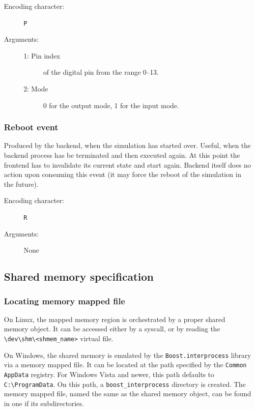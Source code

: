 \begin{description}
    \item[Encoding character:] \texttt{P}
    \item[Arguments:] \hfill
    \begin{description}
        \item[1: Pin index] of the digital pin from the range 0--13.
        \item[2: Mode] 0 for the output mode, 1 for the input mode.
    \end{description}
\end{description}

\subsubsection{Reboot event}
Produced by the backend, when the simulation has started over. Useful, when the backend process has be
terminated and then executed again. At this point the frontend has to invalidate its current state and start again. Backend itself does no action upon consuming this event (it may force the reboot of the simulation in the future).

\begin{description}
    \item[Encoding character:] \texttt{R}
    \item[Arguments:] None
\end{description}

\subsection{Shared memory specification} \label{shmem_specs}

\subsubsection{Locating memory mapped file}
On Linux, the mapped memory region is orchestrated by a proper shared memory object. It can be accessed either by a syscall, or by reading the \texttt{\textbackslash{}dev\textbackslash{}shm\textbackslash{}<shmem\_name>} virtual file.

On Windows, the shared memory is emulated by the \texttt{Boost.interprocess} library via a memory mapped file. It can be located at the path specified by the \texttt{Common AppData} registry. For Windows Vista and newer, this path defaults to \texttt{C:\textbackslash{}ProgramData}. On this path, a \texttt{boost\_interprocess} directory is created. The memory mapped file, named the same as the shared memory object, can be found in one if its subdirectories. \cite{boost_shared_memory}

